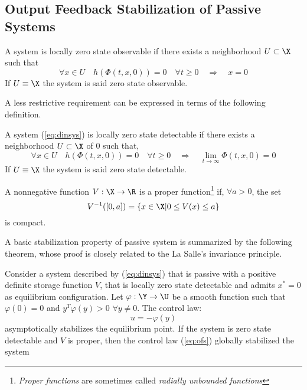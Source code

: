 \subsection{Output Feedback Stabilization of Passive Systems}
%
\begin{defn}[Observability]
	A system is locally zero state observable if there exists a neighborhood $U\subset\X$ such that
	\begin{equation*}
	\forall x\in U\quad h(\Phi(t,x,0))=0\quad\forall t\geq 0 \quad\Rightarrow\quad x=0
	\end{equation*}
	If $U\equiv\X$ the system is said zero state observable.
\end{defn}
A less restrictive requirement can be expressed in terms of the following definition.
\begin{defn}[Detectability]
	A system (\ref{eq:dinsys}) is locally zero state detectable if there exists a neighborhood $U\subset\X$ of $0$ such that,
	\begin{equation*}
	\forall x\in U\quad h(\Phi(t,x,0))=0\quad\forall t\geq 0 \quad\Rightarrow\quad\lim\limits_{t\rightarrow\infty}\Phi(t,x,0)=0
	\end{equation*}
	If $U\equiv\X$ the system is said zero state detectable.
\end{defn}
%
%
\begin{defn}
	A nonnegative function $V:\X\rightarrow\R$ is a proper function\footnote{\textit{Proper functions} are sometimes called \textit{radially unbounded functions}} if, $\forall a > 0$, the set
	\begin{equation*}
	V^{-1}([0,a]) = \left\{x\in\X|0\leq V(x)\leq a \right\}
	\end{equation*}
	is compact.
\end{defn}
%
A basic stabilization property of passive system is summarized by the following theorem, whose proof is closely related to the La Salle's invariance principle. 
\begin{thm}
	Consider a system described by (\ref{eq:dinsys}) that is passive with a positive definite storage function $V$, that is locally zero state detectable and admits $x^*=0$ as equilibrium configuration. Let $\varphi:\Y\rightarrow\U$ be a smooth function such that $\varphi(0)=0$ and $y^T\varphi(y)>0$ $\forall y\neq 0$. The control law:
	\begin{equation}\label{eq:ofs}
	u=-\varphi(y)
	\end{equation}
	asymptotically stabilizes the equilibrium point. If the system is zero state detectable and $V$ is proper, then the control law (\ref{eq:ofs}) globally stabilized the system
\end{thm}
